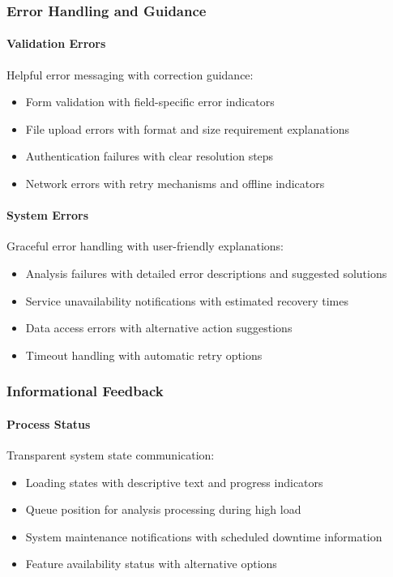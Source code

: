 \documentclass[12pt,a4paper]{article}
\begin{document}
    \subsubsection{Error Handling and Guidance}

    \paragraph{Validation Errors}
    Helpful error messaging with correction guidance:
    \begin{itemize}[leftmargin=0.5in]
        \item Form validation with field-specific error indicators
        \item File upload errors with format and size requirement explanations
        \item Authentication failures with clear resolution steps
        \item Network errors with retry mechanisms and offline indicators
    \end{itemize}

    \paragraph{System Errors}
    Graceful error handling with user-friendly explanations:
    \begin{itemize}[leftmargin=0.5in]
        \item Analysis failures with detailed error descriptions and suggested solutions
        \item Service unavailability notifications with estimated recovery times
        \item Data access errors with alternative action suggestions
        \item Timeout handling with automatic retry options
    \end{itemize}

    \subsubsection{Informational Feedback}

    \paragraph{Process Status}
    Transparent system state communication:
    \begin{itemize}[leftmargin=0.5in]
        \item Loading states with descriptive text and progress indicators
        \item Queue position for analysis processing during high load
        \item System maintenance notifications with scheduled downtime information
        \item Feature availability status with alternative options
    \end{itemize}
\end{document}
